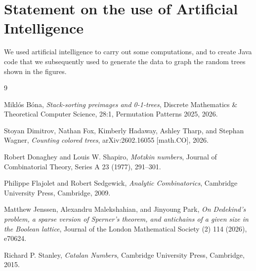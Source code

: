 \documentclass[11pt, onesided]{amsart}
\theoremstyle{remark}
\begin{document}
\section*{Statement on the use of Artificial Intelligence}
We used artificial intelligence to carry out some computations, and to create Java code that we subsequently used to generate the data to graph the random trees shown in the figures.



\begin{thebibliography}{9}

Mikl\'os B\'ona,
\emph{Stack-sorting preimages and 0-1-trees},
Discrete Mathematics \& Theoretical Computer Science, 28:1, Permutation Patterns 2025, 2026.

Stoyan Dimitrov, Nathan Fox, Kimberly Hadaway, Ashley Tharp, and Stephan Wagner,
\emph{Counting colored trees},
arXiv:2602.16055 [math.CO], 2026.

Robert Donaghey and Louis W. Shapiro,
\emph{Motzkin numbers},
Journal of Combinatorial Theory, Series A 23 (1977), 291--301.

Philippe Flajolet and Robert Sedgewick,
\emph{Analytic Combinatorics},
Cambridge University Press, Cambridge, 2009.

Matthew Jenssen, Alexandru Malekshahian, and Jinyoung Park,
\emph{On Dedekind's problem, a sparse version of Sperner's theorem, and antichains of a given size in the Boolean lattice},
Journal of the London Mathematical Society (2) 114 (2026), e70624.

Richard P. Stanley,
\emph{Catalan Numbers},
Cambridge University Press, Cambridge, 2015.

\end{thebibliography}
\end{document}
